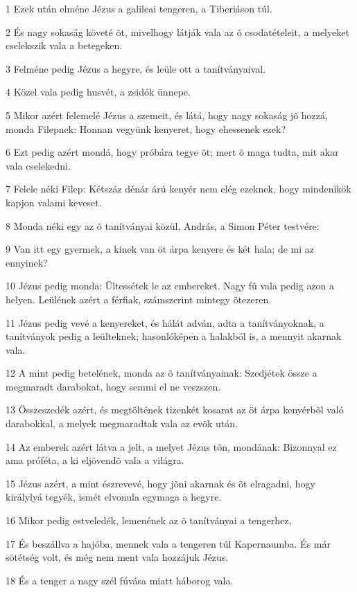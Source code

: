 \par 1 Ezek után elméne Jézus a galileai tengeren, a Tiberiáson túl.
\par 2 És nagy sokaság követé õt, mivelhogy látják vala az õ csodatételeit, a melyeket cselekszik vala a betegeken.
\par 3 Felméne pedig Jézus a hegyre, és leüle ott a tanítványaival.
\par 4 Közel vala pedig husvét, a zsidók ünnepe.
\par 5 Mikor azért felemelé Jézus a szemeit, és látá, hogy nagy sokaság jõ hozzá, monda Filepnek: Honnan vegyünk kenyeret, hogy ehessenek ezek?
\par 6 Ezt pedig azért mondá, hogy próbára tegye õt; mert õ maga tudta, mit akar vala cselekedni.
\par 7 Felele néki Filep: Kétszáz dénár árú kenyér nem elég ezeknek, hogy mindenikök kapjon valami keveset.
\par 8 Monda néki egy az õ tanítványai közül, András, a Simon Péter testvére:
\par 9 Van itt egy gyermek, a kinek van öt árpa kenyere és két hala; de mi az ennyinek?
\par 10 Jézus pedig monda: Ültessétek le az embereket. Nagy fû vala pedig azon a helyen. Leülének azért a férfiak, számszerint mintegy ötezeren.
\par 11 Jézus pedig vevé a kenyereket, és hálát adván, adta a tanítványoknak, a tanítványok pedig a leülteknek; hasonlóképen a halakból is, a mennyit akarnak vala.
\par 12 A mint pedig betelének, monda az õ tanítványainak: Szedjétek össze a megmaradt darabokat, hogy semmi el ne veszszen.
\par 13 Összeszedék azért, és megtöltének tizenkét kosarat az öt árpa kenyérbõl való darabokkal, a melyek megmaradtak vala az evõk után.
\par 14 Az emberek azért látva a jelt, a melyet Jézus tõn, mondának: Bizonnyal ez ama próféta, a ki eljövendõ vala a világra.
\par 15 Jézus azért, a mint észrevevé, hogy jõni akarnak és õt elragadni, hogy királylyá tegyék, ismét elvonula egymaga a hegyre.
\par 16 Mikor pedig estveledék, lemenének az õ tanítványai a tengerhez,
\par 17 És beszállva a hajóba, mennek vala a tengeren túl Kapernaumba. És már sötétség volt, és még nem ment vala hozzájuk Jézus.
\par 18 És a tenger a nagy szél fúvása miatt háborog vala.
